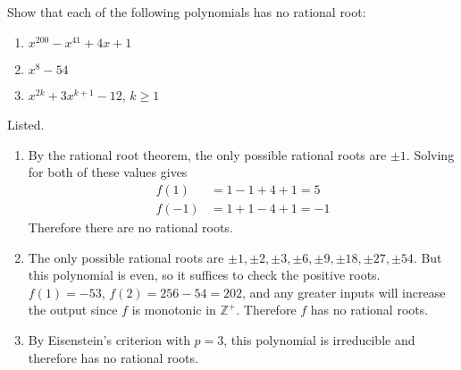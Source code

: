   \begin{exercise}[Shifrin 3.3.4]
    Show that each of the following polynomials has no rational root:
    \begin{enumerate}
      \item $x^{200} - x^{41} + 4x + 1$
      \item $x^8 - 54$
      \item $x^{2k} + 3x^{k+1} - 12$, $k \geq 1$
    \end{enumerate}
  \end{exercise}
  \begin{solution}
    Listed. 
    \begin{enumerate}
      \item By the rational root theorem, the only possible rational roots are $\pm1$. Solving for both of these values gives 
      \begin{align}
        f(1) & = 1 - 1 + 4 + 1 = 5 \\ 
        f(-1)& = 1 + 1 - 4 + 1 = -1
      \end{align}
      Therefore there are no rational roots. 

      \item The only possible rational roots are $\pm 1, \pm 2, \pm 3, \pm 6, \pm 9, \pm 18, \pm 27, \pm 54$. But this polynomial is even, so it suffices to check the positive roots. $f(1) = -53$, $f(2) = 256 - 54 = 202$, and any greater inputs will increase the output since $f$ is monotonic in $\mathbb{Z}^+$. Therefore $f$ has no rational roots. 

      \item By Eisenstein's criterion with $p = 3$, this polynomial is irreducible and therefore has no rational roots. 
    \end{enumerate}
  \end{solution}

